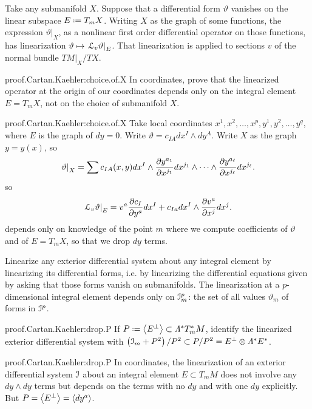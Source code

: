 Take any submanifold \(X\).
Suppose that a differential form \(\vartheta\) vanishes on the linear subspace \(E\defeq T_m X\).
Writing \(X\) as the graph of some functions, the expression \(\left.\vartheta\right|_X\), as a nonlinear first order differential operator on those functions, has linearization  \(\vartheta \mapsto \left.\EuScript L_v \vartheta\right|_E\).
That linearization is applied to sections \(v\) of the normal bundle \(\left.TM\right|_X/TX\).
\begin{problem}{proof.Cartan.Kaehler:choice.of.X}
In coordinates, prove that the linearized operator at the origin of our coordinates depends only on the integral element \(E=T_m X\), not on the choice of submanifold \(X\).
\end{problem}
\begin{answer}{proof.Cartan.Kaehler:choice.of.X}
Take local coordinates \(x^1,x^2,\dots,x^p, y^1,y^2,\dots,y^q\), where \(E\) is the graph of \(dy=0\). 
Write \(\vartheta = c_{IA} dx^I\wedge dy^A\).
Write \(X\) as the graph \(y=y(x)\), so
\[
\left.\vartheta\right|_X = \sum c_{IA}(x,y) dx^I \wedge 
\pderiv{y^{a_1}}{x^{j_1}} dx^{j_1} \wedge \dots \wedge \pderiv{y^{a_{\ell}}}{x^{j_{\ell}}} dx^{j_{\ell}}.
\]
so
\[
\left.\LieDer_v \vartheta\right|_E
=
v^a \pderiv{c_I}{y^a} dx^I
+ c_{Ia} dx^I \wedge \pderiv{v^a}{x^j} dx^j.
\]%
depends only on knowledge of the point \(m\) where we compute coefficients of \(\vartheta\) and of \(E=T_m X\), so that we drop \(dy\) terms.
\end{answer}
Linearize any exterior differential system about any integral element by linearizing its differential forms, i.e. by linearizing the differential equations given by asking that those forms vanish on submanifolds.
The linearization at a \(p\)-dimensional integral element depends only on \(\mathcal{I}^p_m\): the set of all values \(\vartheta_m\) of forms in \(\mathcal{I}^p\).
\begin{problem}{proof.Cartan.Kaehler:drop.P}
If \(P\defeq \spn{E^{\perp}} \subset \Lm{*}{T_m^*M}\), identify the linearized exterior differential system with \(\pr{\II_m + P^2}/P^2 \subset P/P^2 = E^{\perp} \otimes \Lm{*}{E}^*\).
\end{problem}
\begin{answer}{proof.Cartan.Kaehler:drop.P}
In coordinates, the linearization of an exterior differential system \(\mathcal{I}\) about an integral element \(E \subset T_m M\) does not involve any \(dy \wedge dy\) terms but depends on the terms with no \(dy\) and with one \(dy\) explicitly.
But \(P=\left<E^{\perp}\right>=\left<dy^a\right>\).
\end{answer}
